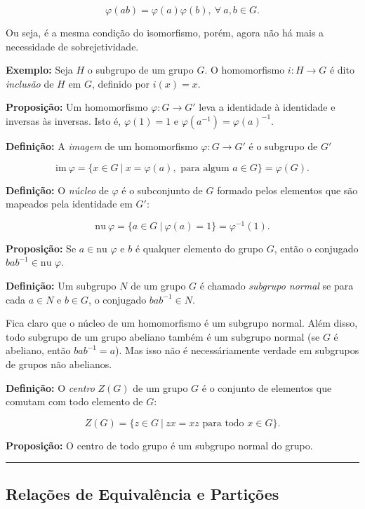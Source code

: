\documentclass[11pt]{article}
\begin{document}
\[\varphi(ab) = \varphi(a)\varphi(b), \ \forall \ a,b\in G.\]

Ou seja, é a mesma condição do isomorfismo, porém, agora não há mais a
necessidade de sobrejetividade.

\textbf{Exemplo:} Seja \(H\) o subgrupo de um grupo \(G\). O
homomorfismo \(i: H \longrightarrow G\) é dito \emph{inclusão} de \(H\)
em \(G\), definido por \(i(x) = x\).

\textbf{Proposição:} Um homomorfismo \(\varphi: G\longrightarrow G'\)
leva a identidade à identidade e inversas às inversas. Isto é,
\(\varphi(1) = 1\) e \(\varphi(a^{-1}) = \varphi(a)^{-1}\).

\textbf{Definição:} A \emph{imagem} de um homomorfismo
\(\varphi: G\longrightarrow G'\) é o subgrupo de \(G'\)

\[\text{im}\ \varphi = \{x\in G \ |\ x = \varphi(a), \text{ para algum } a\in G\} = \varphi(G).\]

\textbf{Definição:} O \emph{núcleo} de \(\varphi\) é o subconjunto de
\(G\) formado pelos elementos que são mapeados pela identidade em
\(G'\):

\[\text{nu} \ \varphi = \{a \in G \ | \ \varphi(a) = 1\} = \varphi^{-1}(1).\]

\textbf{Proposição:} Se \(a\in \text{nu }\varphi\) e \(b\) é qualquer
elemento do grupo \(G\), então o conjugado
\(bab^{-1} \in \text{nu }\varphi\).

\textbf{Definição:} Um subgrupo \(N\) de um grupo \(G\) é chamado
\emph{subgrupo normal} se para cada \(a\in N\) e \(b\in G\), o conjugado
\(bab^{-1} \in N\).

Fica claro que o núcleo de um homomorfismo é um subgrupo normal. Além
disso, todo subgrupo de um grupo abeliano também é um subgrupo normal
(se \(G\) é abeliano, então \(bab^{-1} = a\)). Mas isso não é
necessáriamente verdade em subgrupos de grupos não abelianos.

\textbf{Definição:} O \emph{centro} \(Z(G)\) de um grupo \(G\) é o
conjunto de elementos que comutam com todo elemento de \(G\):

\[Z(G) = \{z \in G \ | \ zx = xz \text{ para todo } x \in G\}.\]

\textbf{Proposição:} O centro de todo grupo é um subgrupo normal do
grupo.

\begin{center}\rule{0.5\linewidth}{0.5pt}\end{center}

\hypertarget{relauxe7uxf5es-de-equivaluxeancia-e-partiuxe7uxf5es}{%
\subsection{Relações de Equivalência e
Partições}\label{relauxe7uxf5es-de-equivaluxeancia-e-partiuxe7uxf5es}}
\end{document}
